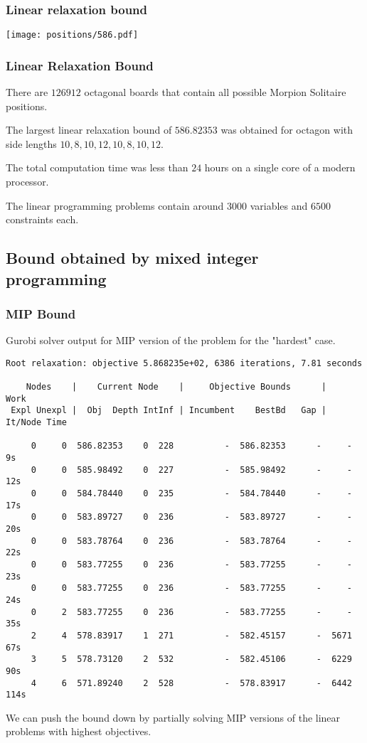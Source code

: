 \documentclass[pdftex]{beamer}
\begin{document}
\begin{frame}
\frametitle{Linear relaxation bound}

\begin{center}
\texttt{[image: positions/586.pdf]}
\end{center}

\end{frame}

\begin{frame}
\frametitle{Linear Relaxation Bound}

There are $126912$ octagonal boards that contain all possible Morpion Solitaire positions.

\vspace{8mm}
The largest linear relaxation bound of $586.82353$ was obtained for octagon with side lengths $10, 8, 10, 12, 10, 8, 10, 12$.

\vspace{8mm}
The total computation time was less than $24$ hours on a single core of a modern processor.

\vspace{8mm}
The linear programming problems contain around $3000$ variables and $6500$ constraints each.
\end{frame}

\subsection{Bound obtained by mixed integer programming}

\begin{frame}[fragile]
\frametitle{MIP Bound}

Gurobi solver output for MIP version of the problem for the "hardest" case.

{\tiny
\begin{verbatim}
Root relaxation: objective 5.868235e+02, 6386 iterations, 7.81 seconds

    Nodes    |    Current Node    |     Objective Bounds      |     Work
 Expl Unexpl |  Obj  Depth IntInf | Incumbent    BestBd   Gap | It/Node Time

     0     0  586.82353    0  228          -  586.82353      -     -    9s
     0     0  585.98492    0  227          -  585.98492      -     -   12s
     0     0  584.78440    0  235          -  584.78440      -     -   17s
     0     0  583.89727    0  236          -  583.89727      -     -   20s
     0     0  583.78764    0  236          -  583.78764      -     -   22s
     0     0  583.77255    0  236          -  583.77255      -     -   23s
     0     0  583.77255    0  236          -  583.77255      -     -   24s
     0     2  583.77255    0  236          -  583.77255      -     -   35s
     2     4  578.83917    1  271          -  582.45157      -  5671   67s
     3     5  578.73120    2  532          -  582.45106      -  6229   90s
     4     6  571.89240    2  528          -  578.83917      -  6442  114s
\end{verbatim}
}

We can push the bound down by partially solving MIP versions of the linear problems with highest objectives.
\end{frame}
\end{document}
